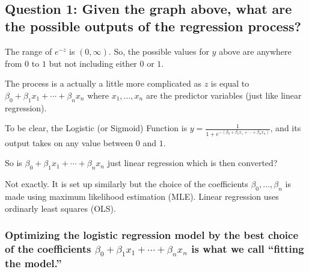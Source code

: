 \documentclass[11pt]{article}
\begin{document}
    \begin{center}
    \end{center}
    { \hspace*{\fill} \\}
    
    \hypertarget{question-1-given-the-graph-above-what-are-the-possible-outputs-of-the-regression-process}{%
\subsection{Question 1: Given the graph above, what are the possible
outputs of the regression
process?}\label{question-1-given-the-graph-above-what-are-the-possible-outputs-of-the-regression-process}}

    The range of \(e^{-z}\) is \((0,\infty)\text{.}\) So, the possible
values for \(y\) above are anywhere from \(0\) to \(1\) but not
including either \(0\) or \(1\).

    The process is a actually a little more complicated as \(z\) is equal to
\(\beta_{0}+\beta_{1}x_{1}+\cdots +\beta_{n}x_{n}\) where
\(x_{1},\dots, x_{n}\) are the predictor variables (just like linear
regression).

To be clear, the Logistic (or Sigmoid) Function is
\(\displaystyle y=\frac{1}{1+e^{-\left(\beta_{0}+\beta_{1}x_{1}+\cdots +\beta_{n}x_{n}\right)}}\text{,}\)
and its output takes on any value between \(0\) and \(1\).

    So is \(\beta_{0}+\beta_{1}x_{1}+\cdots +\beta_{n}x_{n}\) just linear
regression which is then converted?

Not exactly. It is set up similarly but the choice of the coefficients
\(\beta_{0},\dots,\beta_{n}\) is made using maximum likelihood
estimation (MLE). Linear regression uses ordinarly least squares (OLS).

\hypertarget{optimizing-the-logistic-regression-model-by-the-best-choice-of-the-coefficients-beta_0beta_1x_1cdots-beta_nx_n-is-what-we-call-fitting-the-model.}{%
\subsubsection{\texorpdfstring{Optimizing the logistic regression model
by the best choice of the coefficients
\(\beta_{0}+\beta_{1}x_{1}+\cdots +\beta_{n}x_{n}\) is what we call
``fitting the
model.''}{Optimizing the logistic regression model by the best choice of the coefficients \textbackslash{}beta\_\{0\}+\textbackslash{}beta\_\{1\}x\_\{1\}+\textbackslash{}cdots +\textbackslash{}beta\_\{n\}x\_\{n\} is what we call ``fitting the model.''}}\label{optimizing-the-logistic-regression-model-by-the-best-choice-of-the-coefficients-beta_0beta_1x_1cdots-beta_nx_n-is-what-we-call-fitting-the-model.}}
\end{document}
